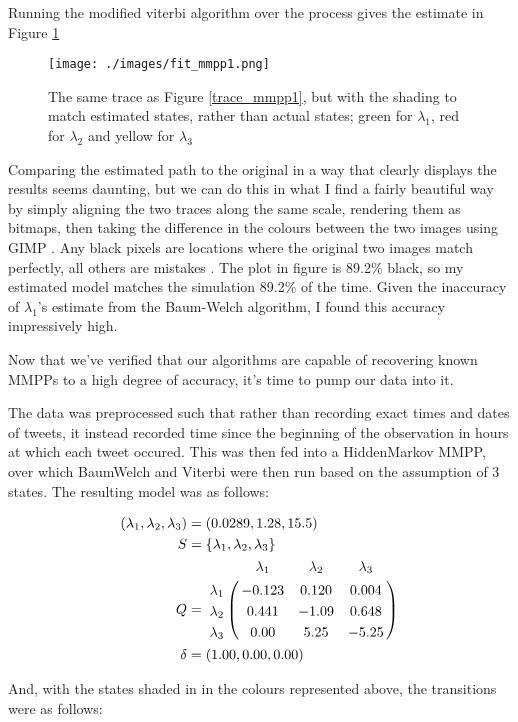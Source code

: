 Running the modified viterbi algorithm over the process gives the estimate in Figure \ref{fit_mmpp1}

\begin{figure}[h!]
\texttt{[image: ./images/fit\_mmpp1.png]}
\caption{The same trace as Figure \ref{trace_mmpp1}, but with the shading to match estimated states, rather than actual states; green for $\lambda_1$, red for $\lambda_2$ and yellow for $\lambda_3$}
\label{fit_mmpp1}
\end{figure}

Comparing the estimated path to the original in a way that clearly displays the results seems daunting, but we can do this in what I find a fairly beautiful way by simply aligning the two traces along the same scale, rendering them as bitmaps, then taking the difference in the colours between the two images using GIMP
. Any black pixels are locations where the original two images match perfectly, all others are mistakes %
. The plot in figure %
is 89.2\% black, so my estimated model matches the simulation 89.2\% of the time. Given the inaccuracy of $\lambda_1$'s estimate from the Baum-Welch algorithm, I found this accuracy impressively high.

Now that we've verified that our algorithms are capable of recovering known MMPPs to a high degree of accuracy, it's time to pump our data into it.

The data was preprocessed such that rather than recording exact times and dates of tweets, it instead recorded time since the beginning of the observation in hours at which each tweet occured. This was then fed into a HiddenMarkov MMPP, over which BaumWelch and Viterbi were then run based on the assumption of 3 states. The resulting model was as follows:

\begin{align*}
(\lambda_1,\lambda_2,\lambda_3) &= (0.0289,1.28,15.5)\\
S &= \{\lambda_1,\lambda_2,\lambda_3\}\\
Q &= \bordermatrix{      & \lambda_1 & \lambda_2 & \lambda_3\cr
                \lambda_1 & -0.123 & 0.120 & 0.004 \cr
                \lambda_2 & 0.441 & -1.09 & 0.648 \cr
                \lambda_3 & 0.00 & 5.25 & -5.25 \cr
			}\\
\delta &= (1.00,0.00,0.00)
\end{align*}

And, with the states shaded in in the colours represented above, the transitions were as follows:

